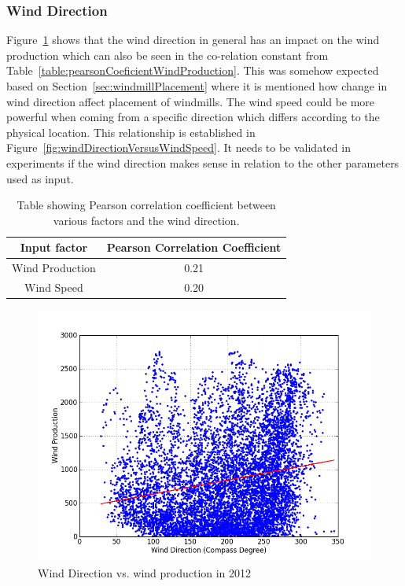 \subsubsection{Wind Direction}
Figure~\ref{fig:windDirVsProd} shows that the wind direction in general has an impact on the wind production which can also be seen in the co-relation constant from Table~\ref{table:pearsonCoeficientWindProduction}. This was somehow expected based on Section~\ref{sec:windmillPlacement} where it is mentioned how change in wind direction affect placement of windmills. The wind speed could be more powerful when coming from a specific direction which differs according to the physical location. This relationship is established in Figure~\ref{fig:windDirectionVersusWindSpeed}. It needs to be validated in experiments if the wind direction makes sense in relation to the other parameters used as input.
 
\begin{table}[H]
\centering  %
\begin{tabular}{c c} %
Input factor & Pearson Correlation Coefficient \\ [0.5ex] %
\hline                  %
Wind Production & 0.21 \\ %
Wind Speed & 0.20 \\ [1ex] %
\hline %
\end{tabular}
\caption{Table showing Pearson correlation coefficient between various factors and the wind direction.} %
\label{table:pearsonCoeficientWindDirection} %
\end{table}

\begin{figure}[H]
\centering
\includegraphics[width=0.99\linewidth,natwidth=898,natheight=587]{billeder/productionVsWindDirection.png}
\caption{Wind Direction vs. wind production in 2012}
\label{fig:windDirVsProd}
\end{figure}

